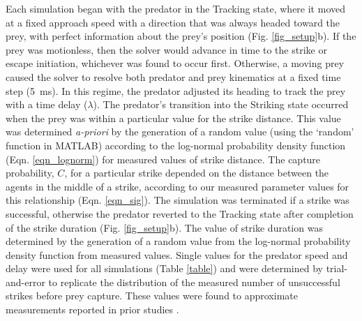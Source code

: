 \documentclass[]{rsos}%
\begin{document}
Each simulation began with the predator in the Tracking state, where it moved at a fixed approach speed with a direction that was always headed toward the prey, with perfect information about the prey's position (Fig. \ref{fig_setup}b). 
If the prey was motionless, then the solver would advance in time to the strike or escape initiation, whichever was found to occur first.
Otherwise, a moving prey caused the solver to resolve both predator and prey kinematics at a fixed time step (\SI{5}{\ms}). 
In this regime, the predator adjusted its heading to track the prey with a time delay ($\lambda$).  
The predator's transition into the Striking state occurred when the prey was within a particular value for the strike distance. 
This value was determined \textit{a-priori} by the generation of a random value (using the `random' function in MATLAB) according to the log-normal probability density function (Eqn. \ref{eqn_lognorm}) for measured values of strike distance.
The capture probability, $C$, for a particular strike depended on the distance between the agents in the middle of a strike, according to our measured parameter values for this relationship (Eqn. \ref{eqn_sig}).
The simulation was terminated if a strike was successful, otherwise the predator reverted to the Tracking state after completion of the strike duration (Fig. \ref{fig_setup}b).
The value of strike duration was determined by the generation of a random value from the log-normal probability density function from measured values.
Single values for the predator speed and delay were used for all simulations (Table \ref{table}) and were determined by trial-and-error to replicate the distribution of the measured number of unsuccessful strikes before prey capture. 
These values were found to approximate measurements reported in prior studies \cite{McHenry:2005tc, Stewart:2013bha}. 
\end{document}
